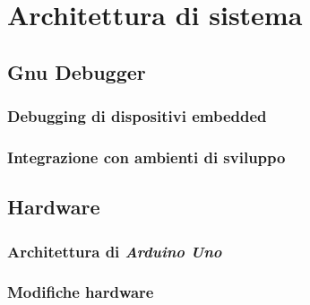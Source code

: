 \chapter{Architettura di sistema}

    \section{Gnu Debugger}
    \subsection{Debugging di dispositivi embedded}
    \subsection{Integrazione con ambienti di sviluppo}

    \section{Hardware}
    \subsection{Architettura di \textit{Arduino Uno}}
    \subsection{Modifiche hardware}